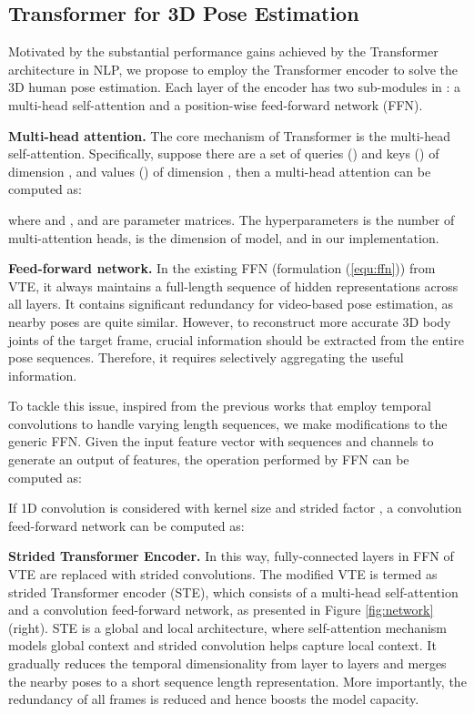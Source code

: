 \documentclass[10pt,twocolumn,letterpaper]{article}
\begin{document}
\subsection{Transformer for 3D Pose Estimation}
Motivated by the substantial performance gains achieved by the Transformer architecture in NLP, we propose to employ the Transformer encoder to solve the 3D human pose estimation. 
Each layer of the encoder has two sub-modules in \cite{Attention}: a multi-head self-attention and a position-wise feed-forward network (FFN). 

\textbf{Multi-head attention.}
The core mechanism of Transformer is the multi-head self-attention. 
Specifically, suppose there are a set of queries () and keys () of dimension , and values () of dimension , then a multi-head attention \cite{Attention} can be computed as:


where  and , and  are parameter matrices. 
The hyperparameters  is the number of multi-attention heads,  is the dimension of model, and  in our implementation. 

\textbf{Feed-forward network. }
In the existing FFN (formulation (\ref{equ:ffn})) from VTE, it always maintains a full-length sequence of hidden representations across all layers. 
It contains significant redundancy for video-based pose estimation, as nearby poses are quite similar. 
However, to reconstruct more accurate 3D body joints of the target frame, crucial information should be extracted from the entire pose sequences. 
Therefore, it requires selectively aggregating the useful information. 

To tackle this issue, inspired from the previous works \cite{pavllo20193d,liu2020attention} that employ temporal convolutions to handle varying length sequences, we make modifications to the generic FFN. 
Given the input feature vector  with  sequences and  channels to generate an output of  features, the operation performed by FFN can be computed as: 


If 1D convolution is considered with kernel size  and strided factor , a convolution feed-forward network can be computed as:


\textbf{Strided Transformer Encoder. }
In this way, fully-connected layers in FFN of VTE are replaced with strided convolutions. 
The modified VTE is termed as strided Transformer encoder (STE), which consists of a multi-head self-attention and a convolution feed-forward network, as presented in Figure \ref{fig:network} (right). 
STE is a global and local architecture,
where self-attention mechanism models global context and strided convolution helps capture local context. 
It gradually reduces the temporal dimensionality from layer to layers and merges the nearby poses to a short sequence length representation. 
More importantly, the redundancy of all frames is reduced and hence boosts the model capacity.  
\end{document}
